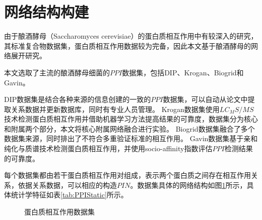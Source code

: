 \section{网络结构构建}
\label{section:NetConstruc}
由于酿酒酵母（Saccharomyces cerevisiae）的蛋白质相互作用中有较深入的研究，其标准复合物数据集，蛋白质相互作用数据较为完备，因此本文基于酿酒酵母的网络展开研究。

本文选取了主流的酿酒酵母细菌的$PPI$数据集，包括DIP\cite{salwinski_database_2004}、Krogan\cite{krogan_global_2006}、Biogrid\cite{stark_biogrid_2006}和Gavin\cite{gavin_proteome_2006}。

DIP数据集是结合各种来源的信息创建的一致的$PPI$数据集，可以自动从论文中提取关系数据并更新数据库，同时有专业人员管理。
Krogan数据集使用$LC_MS/MS$技术检测蛋白质相互作用并借助机器学习方法提高结果的可靠度，数据集分为核心和附属两个部分，本文将核心附属网络融合进行实验。
Biogrid数据集融合了多个数据集来源，同时排出了不符合多重验证标准的相互作用。
Gavin数据集基于亲和纯化与质谱技术检测蛋白质相互作用，并使用socio-affinity指数评估$PPI$检测结果的可靠度。

每个数据集都由若干蛋白质相互作用对组成，表示两个蛋白质之间存在相互作用关系，依据关系数据，可以相应的构造$PIN$。数据集具体的网络结构如图\ref{fig:ppi-datasets}所示，具体统计学特征如表\ref{tab:PPIStatic}所示。

\begin{figure}[htbp]
    \centering
    \vskip0.5cm
    \caption{蛋白质相互作用数据集}\label{fig:chap2:zitu}
    \label{fig:ppi-datasets}
\end{figure}



